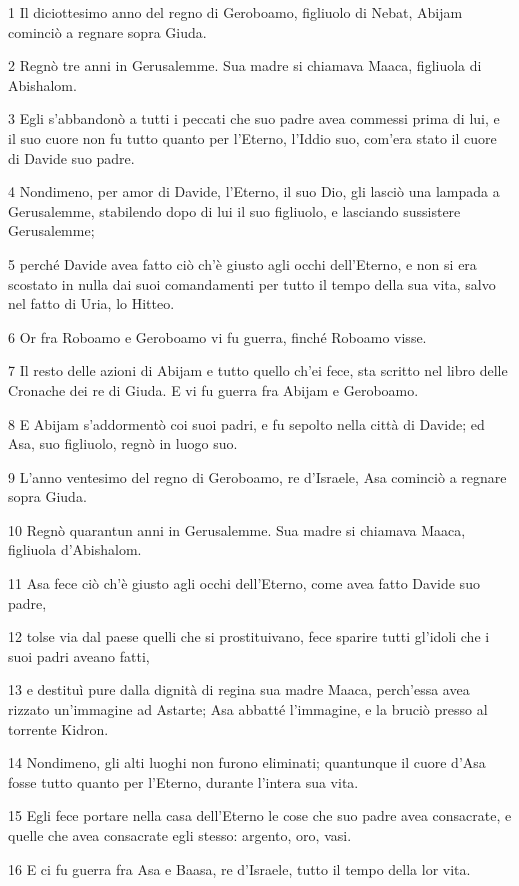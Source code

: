 \par 1 Il diciottesimo anno del regno di Geroboamo, figliuolo di Nebat, Abijam cominciò a regnare sopra Giuda.
\par 2 Regnò tre anni in Gerusalemme. Sua madre si chiamava Maaca, figliuola di Abishalom.
\par 3 Egli s'abbandonò a tutti i peccati che suo padre avea commessi prima di lui, e il suo cuore non fu tutto quanto per l'Eterno, l'Iddio suo, com'era stato il cuore di Davide suo padre.
\par 4 Nondimeno, per amor di Davide, l'Eterno, il suo Dio, gli lasciò una lampada a Gerusalemme, stabilendo dopo di lui il suo figliuolo, e lasciando sussistere Gerusalemme;
\par 5 perché Davide avea fatto ciò ch'è giusto agli occhi dell'Eterno, e non si era scostato in nulla dai suoi comandamenti per tutto il tempo della sua vita, salvo nel fatto di Uria, lo Hitteo.
\par 6 Or fra Roboamo e Geroboamo vi fu guerra, finché Roboamo visse.
\par 7 Il resto delle azioni di Abijam e tutto quello ch'ei fece, sta scritto nel libro delle Cronache dei re di Giuda. E vi fu guerra fra Abijam e Geroboamo.
\par 8 E Abijam s'addormentò coi suoi padri, e fu sepolto nella città di Davide; ed Asa, suo figliuolo, regnò in luogo suo.
\par 9 L'anno ventesimo del regno di Geroboamo, re d'Israele, Asa cominciò a regnare sopra Giuda.
\par 10 Regnò quarantun anni in Gerusalemme. Sua madre si chiamava Maaca, figliuola d'Abishalom.
\par 11 Asa fece ciò ch'è giusto agli occhi dell'Eterno, come avea fatto Davide suo padre,
\par 12 tolse via dal paese quelli che si prostituivano, fece sparire tutti gl'idoli che i suoi padri aveano fatti,
\par 13 e destituì pure dalla dignità di regina sua madre Maaca, perch'essa avea rizzato un'immagine ad Astarte; Asa abbatté l'immagine, e la bruciò presso al torrente Kidron.
\par 14 Nondimeno, gli alti luoghi non furono eliminati; quantunque il cuore d'Asa fosse tutto quanto per l'Eterno, durante l'intera sua vita.
\par 15 Egli fece portare nella casa dell'Eterno le cose che suo padre avea consacrate, e quelle che avea consacrate egli stesso: argento, oro, vasi.
\par 16 E ci fu guerra fra Asa e Baasa, re d'Israele, tutto il tempo della lor vita.
